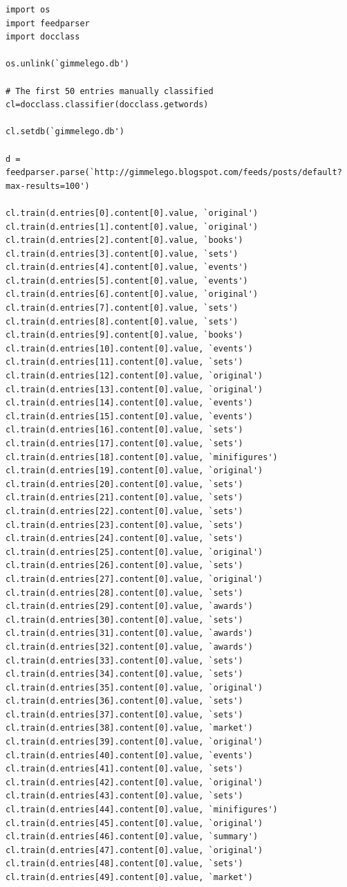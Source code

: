 \documentclass{article}
\begin{document}
\begin{lstlisting}[frame=single, caption=createTrainingData.py, label=createtrainingdata]
import os
import feedparser
import docclass

os.unlink(`gimmelego.db')

# The first 50 entries manually classified
cl=docclass.classifier(docclass.getwords)

cl.setdb(`gimmelego.db')

d = feedparser.parse(`http://gimmelego.blogspot.com/feeds/posts/default?max-results=100')

cl.train(d.entries[0].content[0].value, `original')
cl.train(d.entries[1].content[0].value, `original')
cl.train(d.entries[2].content[0].value, `books')
cl.train(d.entries[3].content[0].value, `sets')
cl.train(d.entries[4].content[0].value, `events')
cl.train(d.entries[5].content[0].value, `events')
cl.train(d.entries[6].content[0].value, `original')
cl.train(d.entries[7].content[0].value, `sets')
cl.train(d.entries[8].content[0].value, `sets')
cl.train(d.entries[9].content[0].value, `books')
cl.train(d.entries[10].content[0].value, `events')
cl.train(d.entries[11].content[0].value, `sets')
cl.train(d.entries[12].content[0].value, `original')
cl.train(d.entries[13].content[0].value, `original')
cl.train(d.entries[14].content[0].value, `events')
cl.train(d.entries[15].content[0].value, `events')
cl.train(d.entries[16].content[0].value, `sets')
cl.train(d.entries[17].content[0].value, `sets')
cl.train(d.entries[18].content[0].value, `minifigures')
cl.train(d.entries[19].content[0].value, `original')
cl.train(d.entries[20].content[0].value, `sets')
cl.train(d.entries[21].content[0].value, `sets')
cl.train(d.entries[22].content[0].value, `sets')
cl.train(d.entries[23].content[0].value, `sets')
cl.train(d.entries[24].content[0].value, `sets')
cl.train(d.entries[25].content[0].value, `original')
cl.train(d.entries[26].content[0].value, `sets')
cl.train(d.entries[27].content[0].value, `original')
cl.train(d.entries[28].content[0].value, `sets')
cl.train(d.entries[29].content[0].value, `awards')
cl.train(d.entries[30].content[0].value, `sets')
cl.train(d.entries[31].content[0].value, `awards')
cl.train(d.entries[32].content[0].value, `awards')
cl.train(d.entries[33].content[0].value, `sets')
cl.train(d.entries[34].content[0].value, `sets')
cl.train(d.entries[35].content[0].value, `original')
cl.train(d.entries[36].content[0].value, `sets')
cl.train(d.entries[37].content[0].value, `sets')
cl.train(d.entries[38].content[0].value, `market')
cl.train(d.entries[39].content[0].value, `original')
cl.train(d.entries[40].content[0].value, `events')
cl.train(d.entries[41].content[0].value, `sets')
cl.train(d.entries[42].content[0].value, `original')
cl.train(d.entries[43].content[0].value, `sets')
cl.train(d.entries[44].content[0].value, `minifigures')
cl.train(d.entries[45].content[0].value, `original')
cl.train(d.entries[46].content[0].value, `summary')
cl.train(d.entries[47].content[0].value, `original')
cl.train(d.entries[48].content[0].value, `sets')
cl.train(d.entries[49].content[0].value, `market')


\end{lstlisting}
\end{document}
